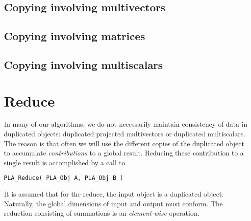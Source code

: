 \subsection{Copying involving multivectors}



\subsection{Copying involving matrices}



\subsection{Copying involving multiscalars}



\section{Reduce}

In many of our algorithms, we do not
necessarily maintain consistency of data in duplicated
objects: duplicated projected multivectors or duplicated
multiscalars.  The reason is that often we will use
the different copies of the duplicated object to accumulate
{\em contributions} to a global result.
Reducing these contribution to a single result is accomplished
by a call to
\begin{FlaSpec}
\begin{verbatim}
PLA_Reduce( PLA_Obj A, PLA_Obj B )
\end{verbatim}
\end{FlaSpec}
It is assumed that for the reduce, the input object is a
duplicated object.
Naturally, the global dimensions of input and output must conform.
The reduction consisting of summations is an {\em element-wise} operation.

